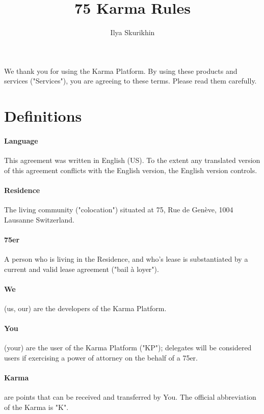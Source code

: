 \documentclass[12pt,a4paper]{article}
\author{Ilya Skurikhin}
\title{75 Karma Rules}
\begin{document}
We thank you for using the Karma Platform. By using these products and services ("Services"), you are agreeing to these terms. Please read them carefully.

\section{Definitions}

\paragraph{Language}

This agreement was written in English (US). To the extent any translated version of this agreement conflicts with the English version, the English version controls.

\paragraph{Residence}

The living community ("colocation") situated at 75, Rue de Genève, 1004 Lausanne Switzerland.

\paragraph{75er}

A person who is living in the Residence, and who's lease is substantiated by a current and valid lease agreement ("bail à loyer").

\paragraph{We}

(us, our) are the developers of the Karma Platform. 

\paragraph{You}

(your) are the user of the Karma Platform ("KP"); delegates will be considered users if exercising a power of attorney on the behalf of a 75er.
	
\paragraph{Karma}

are points that can be received and transferred by You. The official abbreviation of the Karma is "K".
\end{document}
